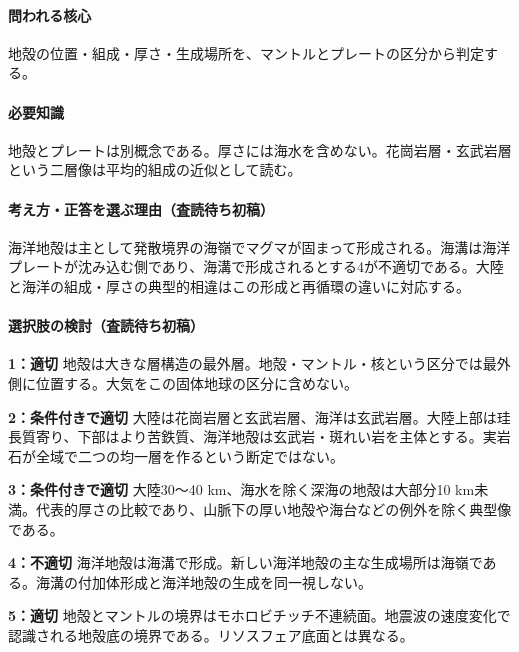 \paragraph{問われる核心} 地殻の位置・組成・厚さ・生成場所を、マントルとプレートの区分から判定する。

\paragraph{必要知識} 地殻とプレートは別概念である。厚さには海水を含めない。花崗岩層・玄武岩層という二層像は平均的組成の近似として読む。

\paragraph{考え方・正答を選ぶ理由（査読待ち初稿）} 海洋地殻は主として発散境界の海嶺でマグマが固まって形成される。海溝は海洋プレートが沈み込む側であり、海溝で形成されるとする4が不適切である。大陸と海洋の組成・厚さの典型的相違はこの形成と再循環の違いに対応する。

\paragraph{選択肢の検討（査読待ち初稿）}\mbox{}\par

\noindent\textbf{1：適切} 地殻は大きな層構造の最外層。地殻・マントル・核という区分では最外側に位置する。大気をこの固体地球の区分に含めない。\par

\noindent\textbf{2：条件付きで適切} 大陸は花崗岩層と玄武岩層、海洋は玄武岩層。大陸上部は珪長質寄り、下部はより苦鉄質、海洋地殻は玄武岩・斑れい岩を主体とする。実岩石が全域で二つの均一層を作るという断定ではない。\par

\noindent\textbf{3：条件付きで適切} 大陸30〜40 km、海水を除く深海の地殻は大部分10 km未満。代表的厚さの比較であり、山脈下の厚い地殻や海台などの例外を除く典型像である。\par

\noindent\textbf{4：不適切} 海洋地殻は海溝で形成。新しい海洋地殻の主な生成場所は海嶺である。海溝の付加体形成と海洋地殻の生成を同一視しない。\par

\noindent\textbf{5：適切} 地殻とマントルの境界はモホロビチッチ不連続面。地震波の速度変化で認識される地殻底の境界である。リソスフェア底面とは異なる。\par

